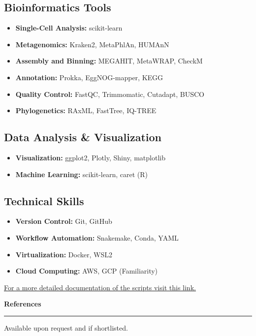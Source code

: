 \documentclass[a4paper,10pt]{article}
\newcommand{\sectiontitle}[1]{\vspace{10pt}\textbf{\Large #1}\vspace{5pt}\hrule\vspace{10pt}}
\begin{document}
	\subsection*{Bioinformatics Tools}
	\begin{itemize}[left=0pt]
		\item \textbf{Single-Cell Analysis:} scikit-learn
		\item \textbf{Metagenomics:} Kraken2, MetaPhlAn, HUMAnN
		\item \textbf{Assembly and Binning:} MEGAHIT, MetaWRAP, CheckM
		\item \textbf{Annotation:} Prokka, EggNOG-mapper, KEGG
		\item \textbf{Quality Control:} FastQC, Trimmomatic, Cutadapt, BUSCO
		\item \textbf{Phylogenetics:} RAxML, FastTree, IQ-TREE
	\end{itemize}
	
	\subsection*{Data Analysis \& Visualization}
	\begin{itemize}[left=0pt]
		\item \textbf{Visualization:} ggplot2, Plotly, Shiny, matplotlib
		\item \textbf{Machine Learning:} scikit-learn, caret (R)
	\end{itemize}
	
	\subsection*{Technical Skills}
	\begin{itemize}[left=0pt]
		\item \textbf{Version Control:} Git, GitHub
		\item \textbf{Workflow Automation:} Snakemake, Conda, YAML
		\item \textbf{Virtualization:} Docker, WSL2
		\item \textbf{Cloud Computing:} AWS, GCP (Familiarity)
	\end{itemize}


\href{https://github.com/GABallena/Hunting/blob/master/CV.pdf}{For a more detailed documentation of the scripts visit this link.} 
	
	\sectiontitle{References}
	Available upon request and if shortlisted.
	

	
\end{document}
